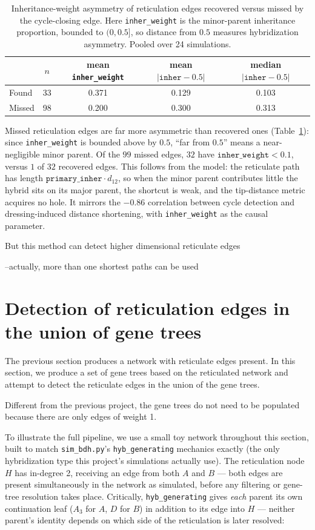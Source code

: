 \begin{table}[htbp]
  \centering
  \caption{Inheritance-weight asymmetry of reticulation edges recovered versus
    missed by the cycle-closing edge. Here \texttt{inher\_weight} is the
    minor-parent inheritance proportion, bounded to $(0,0.5]$, so distance from
    $0.5$ measures hybridization asymmetry. Pooled over 24 simulations.}
  \label{tab:inher-weight-recovery}
  \begin{tabular}{lcccc}
    \toprule
    & $n$ & mean \texttt{inher\_weight} & mean $|\texttt{inher}-0.5|$ & median $|\texttt{inher}-0.5|$ \\
    \midrule
    Found & 33 & 0.371 & 0.129 & 0.103 \\
    Missed                         & 98 & 0.200 & 0.300 & 0.313 \\
    \bottomrule
  \end{tabular}
\end{table}
Missed reticulation edges are far more asymmetric than recovered ones
(Table~\ref{tab:inher-weight-recovery}): since \texttt{inher\_weight} is bounded above by $0.5$, ``far from $0.5$'' means a near-negligible minor parent. Of the $99$ missed edges, $32$ have $\texttt{inher\_weight} < 0.1$, versus $1$ of $32$ recovered edges. This follows from the model: the reticulate path has length $\texttt{primary\_inher}\cdot d_{12}$, so when the minor parent contributes little the hybrid sits on its major parent, the shortcut is weak, and the tip-distance metric acquires no hole. It mirrors the $-0.86$ correlation between cycle detection and dressing-induced distance shortening, with \texttt{inher\_weight} as the causal parameter.

But this method can detect higher dimensional reticulate edges

--actually, more than one shortest paths can be used

\section{Detection of reticulation edges in the union of gene trees}
The previous section produces a network with reticulate edges present. In this section, we produce a set of gene trees based on the reticulated network and attempt to detect the reticulate edges in the union of the gene trees. 

Different from the previous project, the gene trees do not need to be populated because there are only edges of weight 1.

To illustrate the full pipeline, we use a small toy network throughout this section, built to match \texttt{sim\_bdh.py}'s \texttt{hyb\_generating} mechanics exactly (the only hybridization type this project's simulations actually use). The reticulation node $H$ has in-degree 2, receiving an edge from both $A$ and $B$ --- both edges are present simultaneously in the network as simulated, before any filtering or gene-tree resolution takes place. Critically, \texttt{hyb\_generating} gives \emph{each} parent its own continuation leaf ($A_3$ for $A$, $D$ for $B$) in addition to its edge into $H$ --- neither parent's identity depends on which side of the reticulation is later resolved:

